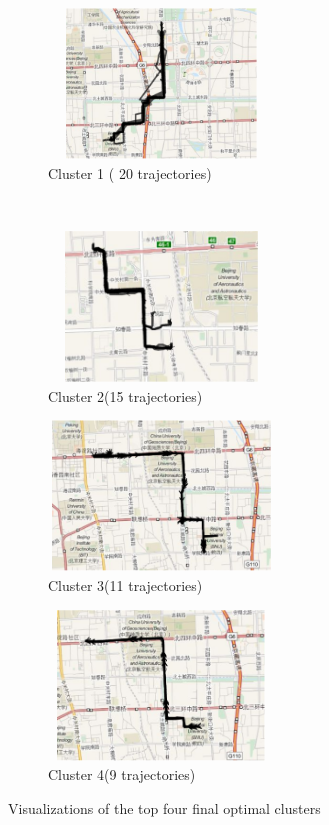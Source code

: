 \begin{figure}
    \centering
    \begin{subfigure}{.5\textwidth}
        \centering
        \includegraphics[width=6cm,height=4cm,keepaspectratio]{figs/new/FinalCluster1.eps}
        \caption{Cluster 1 ( 20 trajectories)}
    \end{subfigure}%
    ~ 
    \begin{subfigure}{.5\textwidth}
        \centering
        \includegraphics[width=6cm,height=4cm,keepaspectratio]{figs/new/FinalCluster2.eps}
        \caption{Cluster 2(15 trajectories)}
    \end{subfigure}
    
    \begin{subfigure}{.5\textwidth}
        \centering
        \includegraphics[width=6cm,height=4cm,keepaspectratio]{figs/new/FinalCluster3.eps}
        \caption{Cluster 3(11 trajectories)}
    \end{subfigure}%
    \begin{subfigure}{.5\textwidth}
        \centering
        \includegraphics[width=6cm,height=4cm,keepaspectratio]{figs/new/FinalCluster4.eps}
        \caption{Cluster 4(9 trajectories)}
    \end{subfigure}
    \caption{Visualizations of the top four final optimal clusters}
    \label{fig:finalClusters}
\end{figure}


